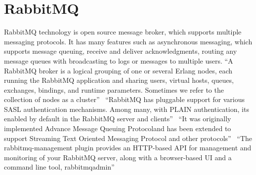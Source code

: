 \section{RabbitMQ}

RabbitMQ technology is open source message broker, which supports multiple 
messaging protocols. It has many features such as asynchronous messaging, 
which supports message queuing, receive and deliver acknowledgments, routing
any message queues with broadcasting to logs or messages to multiple users.
“A RabbitMQ broker is a logical grouping of one or
several Erlang nodes, each running the RabbitMQ application and sharing users,
virtual hosts, queues, exchanges, bindings, and runtime parameters. Sometimes 
we refer to the collection of nodes as a 
cluster”~\cite{hid-sp18-520-RabbitMQCluster}
“RabbitMQ has pluggable support for various SASL authentication mechanisms. 
Among many, with PLAIN authentication, its enabled by default in the RabbitMQ 
server and clients”~\cite{hid-sp18-520-RabbitMQauth}
“It was originally implemented Advance Message Queuing Protocoland has been 
extended to support Streaming Text Oriented Messaging Protocol and other 
protocols”~\cite{hid-sp18-520-RabbitMQ-wiki}
“The rabbitmq-management plugin provides an HTTP-based API for management and 
monitoring of your RabbitMQ server, along with a browser-based UI and a 
command line tool, rabbitmqadmin”~\cite{hid-sp18-520-RabbitMQ-mana}
